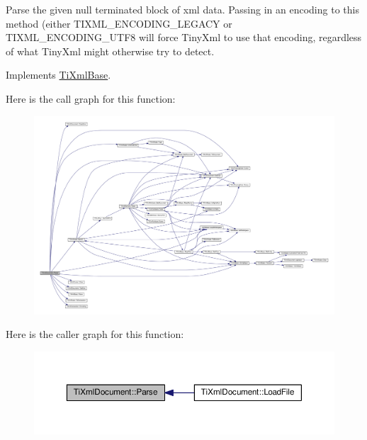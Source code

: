 Parse the given null terminated block of xml data. Passing in an encoding to this method (either T\+I\+X\+M\+L\+\_\+\+E\+N\+C\+O\+D\+I\+N\+G\+\_\+\+L\+E\+G\+A\+CY or T\+I\+X\+M\+L\+\_\+\+E\+N\+C\+O\+D\+I\+N\+G\+\_\+\+U\+T\+F8 will force Tiny\+Xml to use that encoding, regardless of what Tiny\+Xml might otherwise try to detect. 

Implements \hyperlink{class_ti_xml_base_a00e4edb0219d00a1379c856e5a1d2025}{Ti\+Xml\+Base}.

Here is the call graph for this function\+:
\nopagebreak
\begin{figure}[H]
\begin{center}
\leavevmode
\includegraphics[width=350pt]{class_ti_xml_document_a789ad2f06f93d52bdb5570b2f3670289_cgraph}
\end{center}
\end{figure}
Here is the caller graph for this function\+:
\nopagebreak
\begin{figure}[H]
\begin{center}
\leavevmode
\includegraphics[width=350pt]{class_ti_xml_document_a789ad2f06f93d52bdb5570b2f3670289_icgraph}
\end{center}
\end{figure}
\mbox{\label{class_ti_xml_document_aa4e8c1498a76dcde7191c683e1220882}} 
